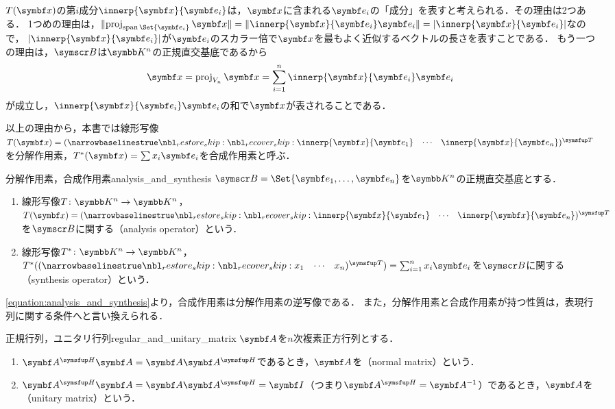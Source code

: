 \documentclass[../../main]{subfiles}
\begin{document}
\(T(\vect{x})\)の第\(i\)成分\(\innerp{\vect{x}}{\vect{e}_i}\)は，\(\vect{x}\)に含まれる\(\vect{e}_i\)の「成分」を表すと考えられる．その理由は2つある．
1つめの理由は，\(\vnorm{\proj_{\spannedby\Set{\vect{e}_i}}\vect{x}}=\vnorm{\innerp{\vect{x}}{\vect{e}_i}\vect{e}_i}=\abs{\innerp{\vect{x}}{\vect{e}_i}}\)なので，
\(\abs{\innerp{\vect{x}}{\vect{e}_i}}\)が\(\vect{e}_i\)のスカラー倍で\(\vect{x}\)を最もよく近似するベクトルの長さを表すことである．
もう一つの理由は，\(\basis{B}\)は\(\numset{K}^n\)の正規直交基底であるから
\begin{equation}
  \label{equation:analysis_and_synthesis}
  \vect{x} = \proj_{V_n}\vect{x}
  = \sum_{i=1}^n\innerp{\vect{x}}{\vect{e}_i}\vect{e}_i
\end{equation}
が成立し，\(\innerp{\vect{x}}{\vect{e}_i}\vect{e}_i\)の和で\(\vect{x}\)が表されることである．

以上の理由から，本書では線形写像\(T(\vect{x})=\trps{\rowvect{\innerp{\vect{x}}{\vect{e}_1} & \cdots & \innerp{\vect{x}}{\vect{e}_n}}}\)を分解作用素，\(\synth{T}(\vect{x})=\sum x_i\vect{e}_i\)を合成作用素と呼ぶ．

\begin{definition}{分解作用素，合成作用素}{analysis_and_synthesis}
  \(\basis{B}=\Set{\vect{e}_1,\dots,\vect{e}_n}\)を\(\numset{K}^n\)の正規直交基底とする．
  \begin{enumerate}
    \item 線形写像\(T\colon\numset{K}^n\to\numset{K}^n\)，\(T(\vect{x})=\trps{\rowvect{\innerp{\vect{x}}{\vect{e}_1} & \cdots & \innerp{\vect{x}}{\vect{e}_n}}}\)を\(\basis{B}\)に関する（analysis operator）という．
    \item 線形写像\(\synth{T}\colon\numset{K}^n\to\numset{K}^n\)，\(\synth{T}(\trps{\rowvect{x_1 & \cdots & x_n}})=\sum_{i=1}^nx_i\vect{e}_i\)を\(\basis{B}\)に関する（synthesis operator）という．
  \end{enumerate}
\end{definition}

\cref{equation:analysis_and_synthesis}より，合成作用素は分解作用素の逆写像である．
また，分解作用素と合成作用素が持つ性質は，表現行列に関する条件へと言い換えられる．

\begin{definition}{正規行列，ユニタリ行列}{regular_and_unitary_matrix}
  \(\mat{A}\)を\(n\)次複素正方行列とする．
  \begin{enumerate}
    \item \(\htrps{\mat{A}}\mat{A}=\mat{A}\htrps{\mat{A}}\)であるとき，\(\mat{A}\)を（normal matrix）という．
    \item \(\htrps{\mat{A}}\mat{A}=\mat{A}\htrps{\mat{A}}=\imat\)（つまり\(\htrps{\mat{A}}=\mat{A}^{-1}\)）であるとき，\(\mat{A}\)を（unitary matrix）という．
  \end{enumerate}
\end{definition}
\end{document}
